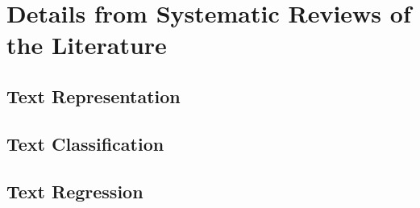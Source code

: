 \chapter{Details from Systematic Reviews of the Literature}


\section{Text Representation}


\section{Text Classification}


\section{Text Regression}